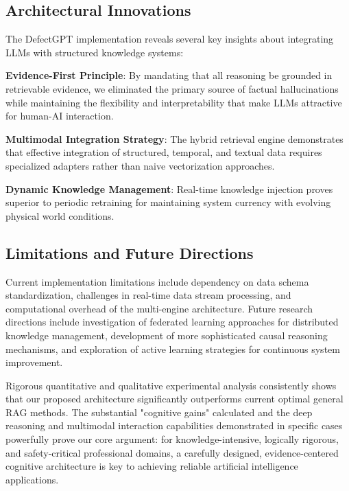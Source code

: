 \subsection{Architectural Innovations}

The DefectGPT implementation reveals several key insights about integrating LLMs with structured knowledge systems:

\textbf{Evidence-First Principle}: By mandating that all reasoning be grounded in retrievable evidence, we eliminated the primary source of factual hallucinations while maintaining the flexibility and interpretability that make LLMs attractive for human-AI interaction.

\textbf{Multimodal Integration Strategy}: The hybrid retrieval engine demonstrates that effective integration of structured, temporal, and textual data requires specialized adapters rather than naive vectorization approaches.

\textbf{Dynamic Knowledge Management}: Real-time knowledge injection proves superior to periodic retraining for maintaining system currency with evolving physical world conditions.

\subsection{Limitations and Future Directions}

Current implementation limitations include dependency on data schema standardization, challenges in real-time data stream processing, and computational overhead of the multi-engine architecture. Future research directions include investigation of federated learning approaches for distributed knowledge management, development of more sophisticated causal reasoning mechanisms, and exploration of active learning strategies for continuous system improvement.

Rigorous quantitative and qualitative experimental analysis consistently shows that our proposed architecture significantly outperforms current optimal general RAG methods. The substantial "cognitive gains" calculated and the deep reasoning and multimodal interaction capabilities demonstrated in specific cases powerfully prove our core argument: for knowledge-intensive, logically rigorous, and safety-critical professional domains, a carefully designed, evidence-centered cognitive architecture is key to achieving reliable artificial intelligence applications.
